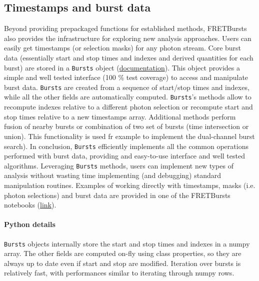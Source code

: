 \subsection{Timestamps and burst data}
\label{sec:burststimes}

Beyond providing prepackaged functions for established methods, 
FRETBursts also provides the infrastructure for exploring new analysis approaches.
Users can easily get timestamps (or selection masks) for any photon stream.
Core burst data (essentially start and stop times and indexes 
and derived quantities for each burst) are stored in a \verb|Bursts| object 
(\href{http://fretbursts.readthedocs.org/en/latest/burstsearch.html}{documentation}).
This object provides a simple and well tested interface (100 \% test coverage) 
to access and manipulate burst data. \verb|Bursts| are created from a sequence of start/stop 
times and indexes, while all the other fields are automatically
computed. \verb|Bursts|'s methods allow to recompute indexes relative to a different photon
selection or recompute start and stop times relative to a new timestamps array.
Additional methods perform fusion of nearby bursts or combination of two set of bursts 
(time intersection or union). This functionality is used fr example to implement 
the dual-channel burst search).
In conclusion, \verb|Bursts| efficiently implements all the common operations performed 
with burst data, providing and easy-to-use interface and well tested algorithms. 
Leveraging \verb|Bursts| methods, users can implement new types of analysis without 
wasting time implementing (and debugging) standard manipulation routines.
Examples of working directly with timestamps, masks (i.e. photon selections) and 
burst data are provided in one of the FRETBursts notebooks (\href{http://nbviewer.jupyter.org/github/tritemio/FRETBursts_notebooks/blob/master/notebooks/Example%20-%20Working%20with%20timestamps%20and%20bursts.ipynb}{link}).

\paragraph{Python details}
\verb|Bursts| objects internally store the start and stop times and indexes in a numpy array.
The other fields are computed on-fly using class properties, so they are always
up to date even if start and stop are modified. Iteration over bursts is
relatively fast, with performances similar to iterating through numpy rows.


